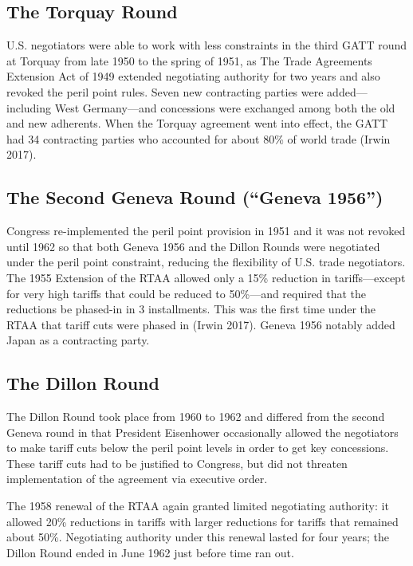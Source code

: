 \documentclass[
  12pt,
]{article}
\begin{document}
\hypertarget{the-torquay-round}{%
\subsection{The Torquay Round}\label{the-torquay-round}}

U.S. negotiators were able to work with less constraints in the third GATT round at Torquay from late 1950 to the spring of 1951, as The Trade Agreements Extension Act of 1949 extended negotiating authority for two years and also revoked the peril point rules. Seven new contracting parties were added---including West Germany---and concessions were exchanged among both the old and new adherents. When the Torquay agreement went into effect, the GATT had 34 contracting parties who accounted for about 80\% of world trade (Irwin 2017).

\hypertarget{the-second-geneva-round-geneva-1956}{%
\subsection{The Second Geneva Round (``Geneva 1956'')}\label{the-second-geneva-round-geneva-1956}}

Congress re-implemented the peril point provision in 1951 and it was not revoked until 1962 so that both Geneva 1956 and the Dillon Rounds were negotiated under the peril point constraint, reducing the flexibility of U.S. trade negotiators. The 1955 Extension of the RTAA allowed only a 15\% reduction in tariffs---except for very high tariffs that could be reduced to 50\%---and required that the reductions be phased-in in 3 installments. This was the first time under the RTAA that tariff cuts were phased in (Irwin 2017). Geneva 1956 notably added Japan as a contracting party.

\hypertarget{the-dillon-round}{%
\subsection{The Dillon Round}\label{the-dillon-round}}

The Dillon Round took place from 1960 to 1962 and differed from the second Geneva round in that President Eisenhower occasionally allowed the negotiators to make tariff cuts below the peril point levels in order to get key concessions. These tariff cuts had to be justified to Congress, but did not threaten implementation of the agreement via executive order.

The 1958 renewal of the RTAA again granted limited negotiating authority: it allowed 20\% reductions in tariffs with larger reductions for tariffs that remained about 50\%. Negotiating authority under this renewal lasted for four years; the Dillon Round ended in June 1962 just before time ran out.
\end{document}
